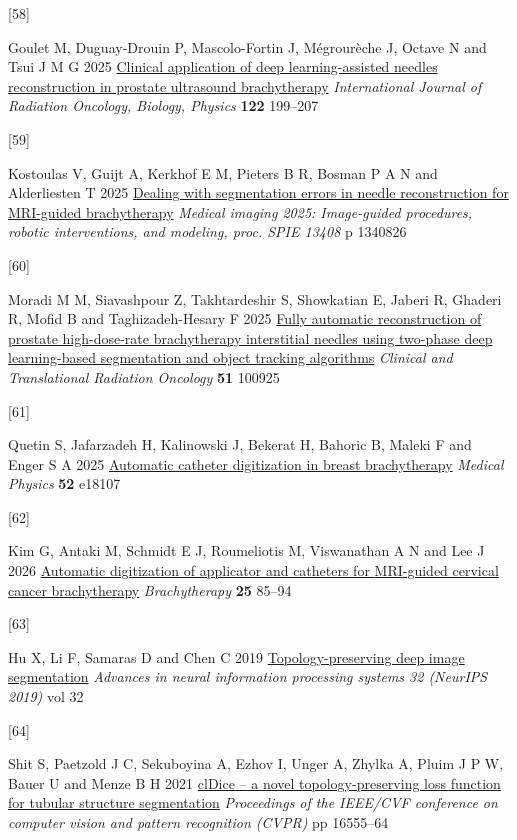 \documentclass[
  11pt,
]{article}
\newlength{\cslhangindent}
\newlength{\csllabelwidth}
\newenvironment{CSLReferences}[2] %
 {\begin{list}{}{%
  \setlength{\itemindent}{0pt}
  \setlength{\leftmargin}{0pt}
  \setlength{\parsep}{0pt}
  \ifodd #1
   \setlength{\leftmargin}{\cslhangindent}
   \setlength{\itemindent}{-1\cslhangindent}
  \fi
  \setlength{\itemsep}{#2\baselineskip}}}
 {\end{list}}
\newcommand{\CSLLeftMargin}[1]{\parbox[t]{\csllabelwidth}{\strut#1\strut}}
\newcommand{\CSLRightInline}[1]{\parbox[t]{\linewidth - \csllabelwidth}{\strut#1\strut}}
\begin{document}
\begin{CSLReferences}{0}{1}
\CSLLeftMargin{{[}58{]} }%
\CSLRightInline{Goulet M, Duguay-Drouin P, Mascolo-Fortin J, Mégrourèche
J, Octave N and Tsui J M G 2025
\href{https://doi.org/10.1016/j.ijrobp.2024.12.026}{Clinical application
of deep learning-assisted needles reconstruction in prostate ultrasound
brachytherapy} \emph{International Journal of Radiation Oncology,
Biology, Physics} \textbf{122} 199--207}

\CSLLeftMargin{{[}59{]} }%
\CSLRightInline{Kostoulas V, Guijt A, Kerkhof E M, Pieters B R, Bosman P
A N and Alderliesten T 2025
\href{https://doi.org/10.1117/12.3043274}{Dealing with segmentation
errors in needle reconstruction for {MRI}-guided brachytherapy}
\emph{Medical imaging 2025: Image-guided procedures, robotic
interventions, and modeling, proc. SPIE 13408} p 1340826}

\CSLLeftMargin{{[}60{]} }%
\CSLRightInline{Moradi M M, Siavashpour Z, Takhtardeshir S, Showkatian
E, Jaberi R, Ghaderi R, Mofid B and Taghizadeh-Hesary F 2025
\href{https://doi.org/10.1016/j.ctro.2025.100925}{Fully automatic
reconstruction of prostate high-dose-rate brachytherapy interstitial
needles using two-phase deep learning-based segmentation and object
tracking algorithms} \emph{Clinical and Translational Radiation
Oncology} \textbf{51} 100925}

\CSLLeftMargin{{[}61{]} }%
\CSLRightInline{Quetin S, Jafarzadeh H, Kalinowski J, Bekerat H, Bahoric
B, Maleki F and Enger S A 2025
\href{https://doi.org/10.1002/mp.18107}{Automatic catheter digitization
in breast brachytherapy} \emph{Medical Physics} \textbf{52} e18107}

\CSLLeftMargin{{[}62{]} }%
\CSLRightInline{Kim G, Antaki M, Schmidt E J, Roumeliotis M, Viswanathan
A N and Lee J 2026
\href{https://doi.org/10.1016/j.brachy.2025.09.017}{Automatic
digitization of applicator and catheters for {MRI}-guided cervical
cancer brachytherapy} \emph{Brachytherapy} \textbf{25} 85--94}

\CSLLeftMargin{{[}63{]} }%
\CSLRightInline{Hu X, Li F, Samaras D and Chen C 2019
\href{https://papers.nips.cc/paper/8803-topology-preserving-deep-image-segmentation}{Topology-preserving
deep image segmentation} \emph{Advances in neural information processing
systems 32 (NeurIPS 2019)} vol 32}

\CSLLeftMargin{{[}64{]} }%
\CSLRightInline{Shit S, Paetzold J C, Sekuboyina A, Ezhov I, Unger A,
Zhylka A, Pluim J P W, Bauer U and Menze B H 2021
\href{https://doi.org/10.1109/CVPR46437.2021.01629}{{clDice} -- a novel
topology-preserving loss function for tubular structure segmentation}
\emph{Proceedings of the IEEE/CVF conference on computer vision and
pattern recognition (CVPR)} pp 16555--64}


\end{CSLReferences}
\end{document}
